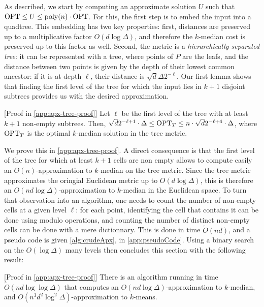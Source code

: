 As described, we start by computing an approximate solution $U$ such that $\text{OPT} \leq U \leq \operatorname{poly}(n) \cdot \text{OPT}$. For this, the first step is to embed the input
into a quadtree. This embedding has two key properties: first, distances are preserved up to a multiplicative factor $O(d \log \Delta)$, and therefore the
$k$-median cost is preserved up to this factor as well. Second, the metric is a \emph{hierarchically separated tree}: it can be represented with a tree, where
points of $P$ are the leafs, and the distance between two points is given by the depth of their lowest common ancestor: if it is at depth $\ell$, their distance
is $\sqrt{d} \Delta 2^{-\ell}$.  Our first lemma shows that finding the first level of the tree for which the input lies in $k+1$ disjoint subtrees provides us
with the desired approximation. 

\begin{lemma}\label{lem:apxTree}
[Proof in \cref{app:apx-tree-proof}] Let $\ell$ be the first level of the tree with at least $k+1$ non-empty subtrees. Then, $\sqrt{d}2^{-\ell+1} \cdot \Delta \leq
\text{OPT}_T \leq n \cdot \sqrt{d}2^{-\ell+4} \cdot \Delta$, where $\text{OPT}_T$ is the optimal $k$-median solution in the tree metric.
\end{lemma}

We prove this in \cref{app:apx-tree-proof}. A direct consequence  is that the first level of the tree for which at least
$k+1$ cells are non empty allows to compute easily an $O(n)$-approximation to $k$-median on the tree metric. Since the tree metric approximates the oringial Euclidean metric up to $O(d \log \Delta)$, this is therefore an $O(n d \log \Delta)$-approximation to $k$-median in the Euclidean space.
 To turn that observation into an algorithm, one needs to count the number of non-empty cells at a given level $\ell$: for each point, identifying the cell that contains it can be done using modulo operations, and counting the number of distinct non-empty cells can be done with a mere dictionnary.
This is done in time $\tilde O(nd)$, and a pseudo code is given \cref{alg:crudeApx}, in \cref{app:pseudoCode}.  Using a binary search on the $O(\log \Delta)$ many levels then concludes this section with the following result:

\begin{lemma}\label{lem:crudeApx}[Proof in \cref{app:apx-tree-proof}]
There is an algorithm running in time $\tilde O(nd \log \log \Delta)$ that computes an $O(n d \log \Delta)$-approximation to $k$-median, and $O(n^3 d^2 \log^2 \Delta)$-approximation to $k$-means.
\end{lemma}



